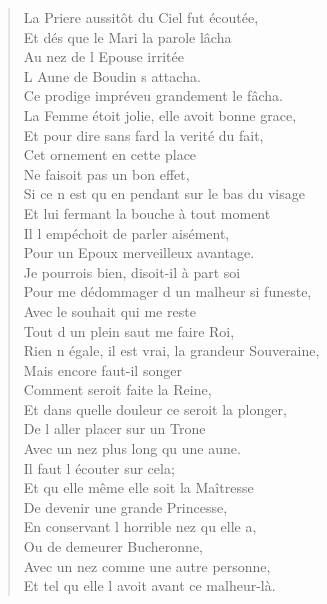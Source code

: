 \begin{verse}
La Priere aussitôt du Ciel fut écoutée, \\
Et dés que le Mari la parole lâcha \\
\vin Au nez de l\textquotesingle{} Epouse irritée \\
\vin L\textquotesingle{} Aune de Boudin s\textquotesingle{} attacha. \\
Ce prodige impréveu grandement le fâcha. \\
La Femme étoit jolie, elle avoit bonne grace, \\
Et pour dire sans fard la verité du fait, \\
\vin Cet ornement en cette place \\
\vin Ne faisoit pas un bon effet, \\
Si ce n\textquotesingle{} est qu\textquotesingle{} en pendant sur le bas du visage \\
Et lui fermant la bouche à tout moment \\
\vin Il l\textquotesingle{} empéchoit de parler aisément, \\
\vin Pour un Epoux merveilleux avantage. \\
Je pourrois bien, disoit-il à part soi \\
Pour me dédommager d\textquotesingle{} un malheur si funeste, \\
\vin Avec le souhait qui me reste \\
\vin Tout d\textquotesingle{} un plein saut me faire Roi, \\
Rien n\textquotesingle{} égale, il est vrai, la grandeur Souveraine, \\
\vin Mais encore faut-il songer \\
\vin Comment seroit faite la Reine, \\
Et dans quelle douleur ce seroit la plonger, \\
\vin De l\textquotesingle{} aller placer sur un Trone \\
\vin Avec un nez plus long qu\textquotesingle{} une aune. \\
\vin Il faut l\textquotesingle{} écouter sur cela; \\
\vin Et qu\textquotesingle{} elle même elle soit la Maîtresse \\
\vin De devenir une grande Princesse, \\
\vin En conservant l\textquotesingle{} horrible nez qu\textquotesingle{} elle a, \\
\vin Ou de demeurer Bucheronne, \\
\vin Avec un nez comme une autre personne, \\
Et tel qu\textquotesingle{} elle l\textquotesingle{} avoit avant ce malheur-là.


\end{verse}
